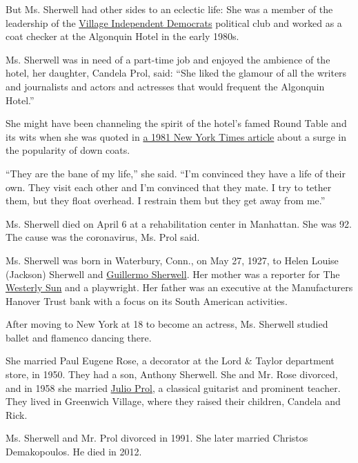 But Ms. Sherwell had other sides to an eclectic life: She was a member
of the leadership of the
\href{https://villagedemocrats.org/55-years-strong/}{Village Independent
Democrats} political club and worked as a coat checker at the Algonquin
Hotel in the early 1980s.

Ms. Sherwell was in need of a part-time job and enjoyed the ambience of
the hotel, her daughter, Candela Prol, said: ``She liked the glamour of
all the writers and journalists and actors and actresses that would
frequent the Algonquin Hotel.''

She might have been channeling the spirit of the hotel's famed Round
Table and its wits when she was quoted in
\href{https://www.nytimes3xbfgragh.onion/1981/01/07/garden/a-problem-in-the-cloakroom-finding-space-for-down-coats.html}{a
1981 New York Times article} about a surge in the popularity of down
coats.

``They are the bane of my life,'' she said. ``I'm convinced they have a
life of their own. They visit each other and I'm convinced that they
mate. I try to tether them, but they float overhead. I restrain them but
they get away from me.''

Ms. Sherwell died on April 6 at a rehabilitation center in Manhattan.
She was 92. The cause was the coronavirus, Ms. Prol said.

Ms. Sherwell was born in Waterbury, Conn., on May 27, 1927, to Helen
Louise (Jackson) Sherwell and
\href{https://timesmachine.nytimes3xbfgragh.onion/timesmachine/1963/05/01/80445766.html?pageNumber=39}{Guillermo
Sherwell}. Her mother was a reporter for The
\href{https://www.thewesterlysun.com/}{Westerly Sun} and a playwright.
Her father was an executive at the Manufacturers Hanover Trust bank with
a focus on its South American activities.

After moving to New York at 18 to become an actress, Ms. Sherwell
studied ballet and flamenco dancing there.

She married Paul Eugene Rose, a decorator at the Lord \& Taylor
department store, in 1950. They had a son, Anthony Sherwell. She and Mr.
Rose divorced, and in 1958 she married
\href{https://www.nytimes3xbfgragh.onion/1999/06/25/classified/paid-notice-deaths-prol-julio.html}{Julio
Prol}, a classical guitarist and prominent teacher. They lived in
Greenwich Village, where they raised their children, Candela and Rick.

Ms. Sherwell and Mr. Prol divorced in 1991. She later married Christos
Demakopoulos. He died in 2012.

